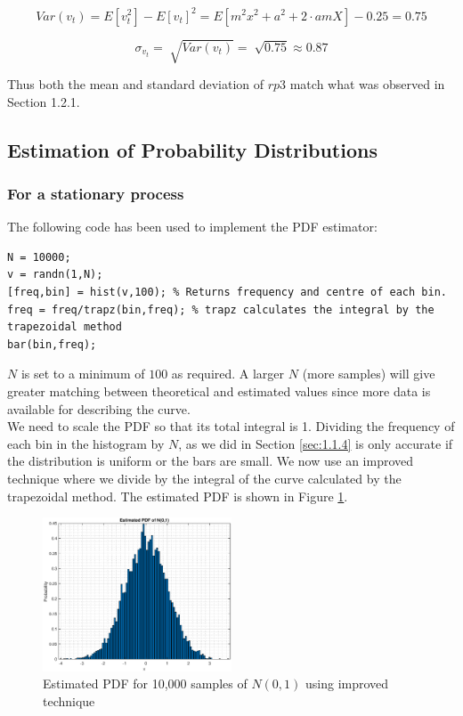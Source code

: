 \begin{equation}
Var(v_t)=E[v_t^2]-E[v_t]^2=E[m^2x^2+a^2+2 \cdot amX] - 0.25 = 0.75
\end{equation}

\begin{equation}
\sigma_{v_t}=\sqrt[]{Var(v_t)}=\sqrt[]{0.75} \approx 0.87
\end{equation}

Thus both the mean and standard deviation of $rp3$ match what was observed in Section 1.2.1.


\vspace{0.5cm}
\subsection{Estimation of Probability Distributions}

\subsubsection{For a stationary process}

The following code has been used to implement the PDF estimator:

\begin{lstlisting}
N = 10000;
v = randn(1,N);
[freq,bin] = hist(v,100); % Returns frequency and centre of each bin.
freq = freq/trapz(bin,freq); % trapz calculates the integral by the trapezoidal method
bar(bin,freq);
\end{lstlisting}

\vspace{0.4cm}

$N$ is set to a minimum of $100$ as required. A larger $N$ (more samples) will give greater matching between theoretical and estimated values since more data is available for describing the curve.\\

We need to scale the PDF so that its total integral is 1. Dividing the frequency of each bin in the histogram by $N$, as we did in Section \ref{sec:1.1.4} is only accurate if the distribution is uniform or the bars are small. We now use an improved technique where we divide by the integral of the curve calculated by the trapezoidal method. The estimated PDF is shown in Figure \ref{fig:pdf}.

\begin{figure}[h!]
\centering
\includegraphics[width=0.5\textwidth]{pdf}
\caption{\label{fig:pdf} Estimated PDF for 10,000 samples of $N(0,1)$ using improved technique}
\end{figure}


